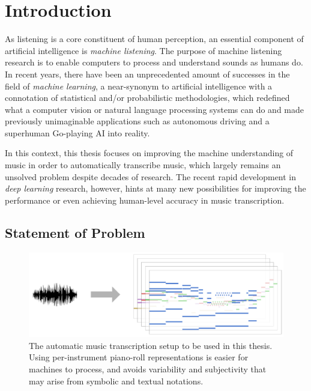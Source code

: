 
\graphicspath{{1-introduction/figures/}}

\chapter{Introduction}
\label{ch:introduction}

As listening is a core constituent of human perception, an essential component of artificial intelligence is \emph{machine listening}.
The purpose of machine listening research is to enable computers to process and understand sounds as humans do.
In recent years, there have been an unprecedented amount of successes in the field of \emph{machine learning}, a near-synonym to artificial intelligence with a connotation of statistical and/or probabilistic methodologies, which redefined what a computer vision or natural language processing systems can do and made previously unimaginable applications such as autonomous driving and a superhuman Go-playing AI into reality.

In this context, this thesis focuses on improving the machine understanding of music in order to automatically transcribe music, which largely remains an unsolved problem despite decades of research.
The recent rapid development in \emph{deep learning} research, however, hints at many new possibilities for improving the performance or even achieving human-level accuracy in music transcription.

\section{Statement of Problem}\label{sec:statement}

\begin{figure}
	\includegraphics[width=\textwidth]{march-transcription.pdf}
	\caption{The automatic music transcription setup to be used in this thesis. Using per-instrument piano-roll representations is easier for machines to process, and avoids variability and subjectivity that may arise from symbolic and textual notations.} 
	\label{fig:transcription-to-piano-rolls}
\end{figure}


